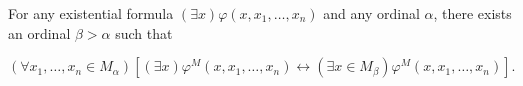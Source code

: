 For any existential formula $(\exists x)\varphi(x, x_1, \ldots, x_n)$ and any ordinal $\alpha$, there exists an ordinal $\beta > \alpha$ such that

$$(\forall x_1, \ldots, x_n \in M_\alpha)[(\exists x)\varphi^M(x, x_1, \ldots, x_n) \leftrightarrow (\exists x \in M_\beta)\varphi^M(x, x_1, \ldots, x_n)].$$
